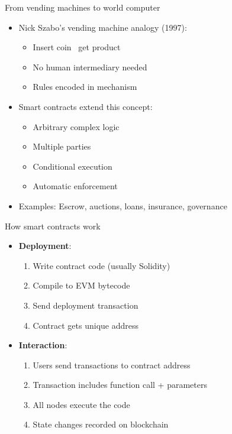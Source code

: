 \documentclass[aspectratio=169, lualatex, handout]{beamer}
\begin{document}
\begin{frame}{From vending machines to world computer}
	\begin{itemize}
		\item Nick Szabo's vending machine analogy (1997):
		      \begin{itemize}
			      \item Insert coin \rightarrow\ get product
			      \item No human intermediary needed
			      \item Rules encoded in mechanism
		      \end{itemize}
		\item Smart contracts extend this concept:
		      \begin{itemize}
			      \item Arbitrary complex logic
			      \item Multiple parties
			      \item Conditional execution
			      \item Automatic enforcement
		      \end{itemize}
		\item Examples: Escrow, auctions, loans, insurance, governance
	\end{itemize}
\end{frame}

\begin{frame}{How smart contracts work}
	\begin{itemize}
		\item \textbf{Deployment}:
		      \begin{enumerate}
			      \item Write contract code (usually Solidity)
			      \item Compile to EVM bytecode
			      \item Send deployment transaction
			      \item Contract gets unique address
		      \end{enumerate}
		\item \textbf{Interaction}:
		      \begin{enumerate}
			      \item Users send transactions to contract address
			      \item Transaction includes function call + parameters
			      \item All nodes execute the code
			      \item State changes recorded on blockchain
		      \end{enumerate}
	\end{itemize}
\end{frame}
\end{document}
